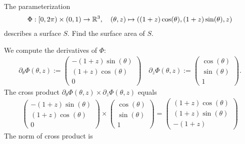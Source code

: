 \documentclass[11pt]{article}
\begin{document}
\begin{exercise}
    The parameterization 
    \begin{align*}
        \Phi : [0,2\pi) \times (0,1) \rightarrow \mathbb{R}^{3}, 
        \quad 
        (\theta,z) \mapsto \left( ( 1 + z ) \cos(\theta), ( 1 + z ) \sin(\theta), z \right)
    \end{align*}
    describes a surface $S$. Find the surface area of $S$.
\end{exercise}
\begin{solution}
    We compute the derivatives of $\Phi$:
    \begin{align*}
        \partial_{\theta} \Phi(\theta,z)
        :=
        \begin{pmatrix}
         - ( 1 + z ) \sin(\theta)
         \\
         ( 1 + z ) \cos(\theta)
         \\
         0
        \end{pmatrix}
        \quad 
        \partial_{z} \Phi(\theta,z)
        :=
        \begin{pmatrix}
         \cos(\theta)
         \\
         \sin(\theta)
         \\
         1
        \end{pmatrix}
        .
    \end{align*}
    The cross product $\partial_{\theta} \Phi(\theta,z) \times \partial_{z} \Phi(\theta,z)$ equals 
    \begin{align*}
        \begin{pmatrix}
         - ( 1 + z ) \sin(\theta)
         \\
         ( 1 + z ) \cos(\theta)
         \\
         0
        \end{pmatrix}
        \times
        \begin{pmatrix}
         \cos(\theta)
         \\
         \sin(\theta)
         \\
         1
        \end{pmatrix}
        =
        \begin{pmatrix}
         ( 1 + z ) \cos(\theta)
         \\
         ( 1 + z ) \sin(\theta)
         \\
         - ( 1 + z )
        \end{pmatrix}
    \end{align*}
    The norm of cross product is 
    \begin{align*}

\end{align*}
\end{solution}
\end{document}
